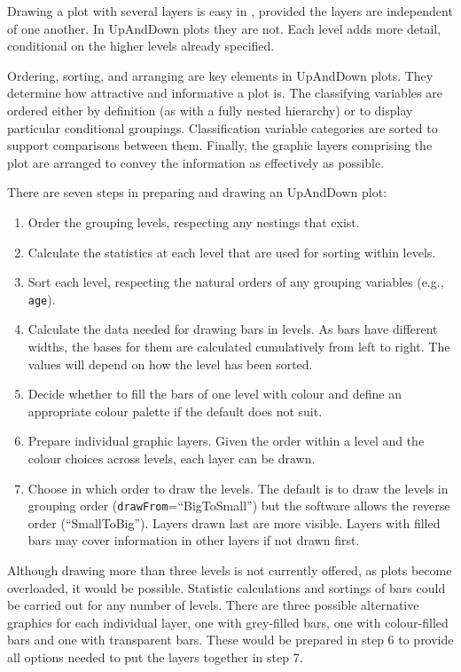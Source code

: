 Drawing a plot with several layers is easy in  \citep{wickham:2022}, provided the layers are independent of one another. In UpAndDown plots they are not. Each level adds more detail, conditional on the higher levels already specified.

Ordering, sorting, and arranging are key elements in UpAndDown plots. They determine how attractive and informative a plot is. The classifying variables are ordered either by definition (as with a fully nested hierarchy) or to display particular conditional groupings. Classification variable categories are sorted to support comparisons between them. Finally, the graphic layers comprising the plot are arranged to convey the information as effectively as possible.

There are seven steps in preparing and drawing an UpAndDown plot:

\begin{enumerate}
\def\labelenumi{\arabic{enumi}.}
\tightlist
\item
  Order the grouping levels, respecting any nestings that exist.
\item
  Calculate the statistics at each level that are used for sorting within levels.
\item
  Sort each level, respecting the natural orders of any grouping variables (e.g., \texttt{age}).
\item
  Calculate the data needed for drawing bars in levels. As bars have different widths, the bases for them are calculated cumulatively from left to right. The values will depend on how the level has been sorted.
\item
  Decide whether to fill the bars of one level with colour and define an appropriate colour palette if the default does not suit.
\item
  Prepare individual graphic layers. Given the order within a level and the colour choices across levels, each layer can be drawn.
\item
  Choose in which order to draw the levels. The default is to draw the levels in grouping order (\texttt{drawFrom}=``BigToSmall'') but the software allows the reverse order (``SmallToBig''). Layers drawn last are more visible. Layers with filled bars may cover information in other layers if not drawn first.
\end{enumerate}

Although drawing more than three levels is not currently offered, as plots become overloaded, it would be possible. Statistic calculations and sortings of bars could be carried out for any number of levels. There are three possible alternative graphics for each individual layer, one with grey-filled bars, one with colour-filled bars and one with transparent bars. These would be prepared in step 6 to provide all options needed to put the layers together in step 7.

